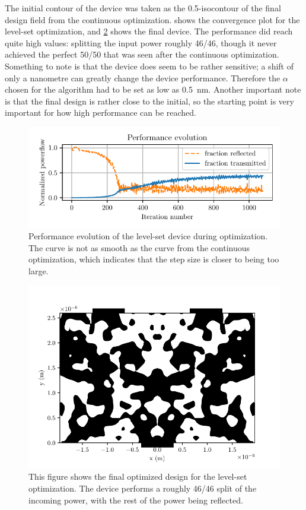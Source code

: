 The initial contour of the device was taken as the 0.5-isocontour of the final
design field from the continuous optimization.
 shows the convergence plot for the level-set optimization,
and \cref{fig:bin_design} shows the final device.
The performance did reach quite high values: splitting the input power roughly
46/46, though it never achieved the perfect 50/50 that was seen after the
continuous optimization.
Something to note is that the device does seem to be rather sensitive;
a shift of only a nanometre can greatly change the device performance.
Therefore the $\alpha$ chosen for the algorithm had to be set as low as
\qty{0.5}{\nm}.
Another important note is that the final design is rather close to the initial,
so the starting point is very important for how high performance can be reached.

\begin{figure}[htpb]
	\centering
	\includegraphics{chapters/results/conv_tmp.pdf}
	\caption{%
		Performance evolution of the level-set device during optimization.
		The curve is not as smooth as the curve from the continuous
		optimization, which indicates that the step size is closer to being too
		large.
	}%
	\label{fig:bin_conv}
\end{figure}

\begin{figure}[htpb]
	\centering
	\includegraphics{chapters/results/bin_design_tmp_254.pdf}
	\caption{%
		This figure shows the final optimized design for the level-set
		optimization. The device performs a roughly 46/46 split of the incoming
		power, with the rest of the power being reflected.
	}%
	\label{fig:bin_design}
\end{figure}
